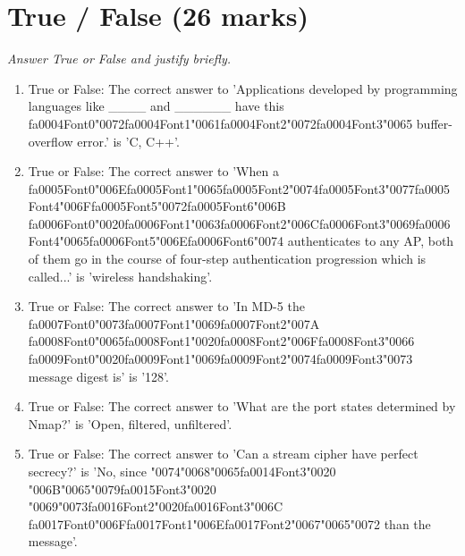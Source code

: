 \documentclass[12pt]{article}
\begin{document}
\section*{True / False (26 marks)}
\textit{Answer True or False and justify briefly.}
\begin{enumerate}[label=\arabic*.]
\item True or False: The correct answer to 'Applications developed by programming languages like \_\_\_\_ and \_\_\_\_\_\_ have this {\csname fa0004Font0\endcsname\char"0072}{\csname fa0004Font1\endcsname\char"0061}{\csname fa0004Font2\endcsname\char"0072}{\csname fa0004Font3\endcsname\char"0065} buffer-overflow error.' is 'C, C++'.
\item True or False: The correct answer to 'When a {\csname fa0005Font0\endcsname\char"006E}{\csname fa0005Font1\endcsname\char"0065}{\csname fa0005Font2\endcsname\char"0074}{\csname fa0005Font3\endcsname\char"0077}{\csname fa0005Font4\endcsname\char"006F}{\csname fa0005Font5\endcsname\char"0072}{\csname fa0005Font6\endcsname\char"006B} {\csname fa0006Font0\endcsname\char"0020}{\csname fa0006Font1\endcsname\char"0063}{\csname fa0006Font2\endcsname\char"006C}{\csname fa0006Font3\endcsname\char"0069}{\csname fa0006Font4\endcsname\char"0065}{\csname fa0006Font5\endcsname\char"006E}{\csname fa0006Font6\endcsname\char"0074} authenticates to any AP, both of them go in the course of four-step authentication progression which is called...' is 'wireless handshaking'.
\item True or False: The correct answer to 'In MD-5 the {\csname fa0007Font0\endcsname\char"0073}{\csname fa0007Font1\endcsname\char"0069}{\csname fa0007Font2\endcsname\char"007A} {\csname fa0008Font0\endcsname\char"0065}{\csname fa0008Font1\endcsname\char"0020}{\csname fa0008Font2\endcsname\char"006F}{\csname fa0008Font3\endcsname\char"0066} {\csname fa0009Font0\endcsname\char"0020}{\csname fa0009Font1\endcsname\char"0069}{\csname fa0009Font2\endcsname\char"0074}{\csname fa0009Font3\endcsname\char"0073} message digest is' is '128'.
\item True or False: The correct answer to 'What are the port states determined by Nmap?' is 'Open, filtered, unfiltered'.
\item True or False: The correct answer to 'Can a stream cipher have perfect secrecy?' is 'No, since {\char"0074}{\char"0068}{\char"0065}{\csname fa0014Font3\endcsname\char"0020} {\char"006B}{\char"0065}{\char"0079}{\csname fa0015Font3\endcsname\char"0020} {\char"0069}{\char"0073}{\csname fa0016Font2\endcsname\char"0020}{\csname fa0016Font3\endcsname\char"006C} {\csname fa0017Font0\endcsname\char"006F}{\csname fa0017Font1\endcsname\char"006E}{\csname fa0017Font2\endcsname\char"0067}{\char"0065}{\char"0072} than the message'.

\end{enumerate}
\end{document}
